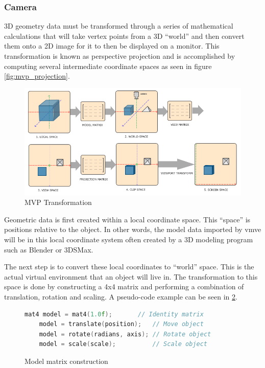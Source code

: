 \documentclass[11pt]{article}
\begin{document}
\subsubsection{Camera} \label{camera}
3D geometry data must be transformed through a series of mathematical
calculations that will take vertex points from a 3D ``world'' and then convert
them onto a 2D image for it to then be displayed on a monitor. This
transformation is known as perspective projection \cite{3d_projection} and is
accomplished by computing several intermediate coordinate spaces as seen in
figure \ref{fig:mvp_projection}.

\begin{figure}[h!]
  \centering
  \includegraphics[width=\textwidth]{images/mvp.png}
  \caption{MVP Transformation \cite{coordinate_systems}}
  \label{fig:mvp_transformation} 
\end{figure}

Geometric data is first created within a local coordinate space. This ``space''
is positions relative to the object. In other words, the model data imported by
\gls{vmve} will be in this local coordinate system often created by a 3D modeling
program such as Blender or 3DSMax.

The next step is to convert these local coordinates to ``world'' space. This is
the actual virtual environment that an object will live in. The transformation
to this space is done by constructing a 4x4 matrix and performing a combination
of translation, rotation and scaling. A pseudo-code example can be seen in
\ref{fig:local_to_world}.

\begin{figure}[ht]
  \centering
  \begin{lstlisting}[language=C++]
    mat4 model = mat4(1.0f);       // Identity matrix
    model = translate(position);   // Move object
    model = rotate(radians, axis); // Rotate object
    model = scale(scale);          // Scale object
  \end{lstlisting}
  \caption{Model matrix construction}
  \label{fig:local_to_world}
\end{figure}
  
\end{document}
